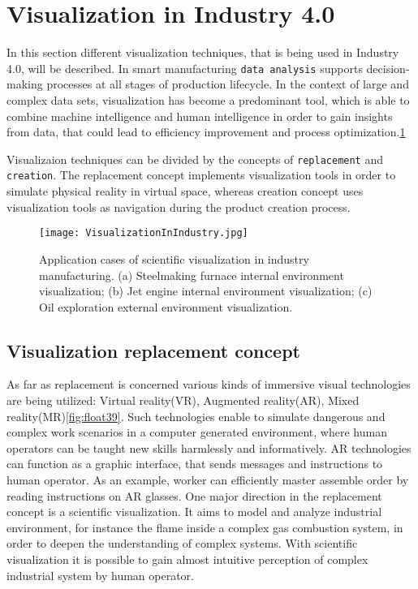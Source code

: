 \documentclass[thesis=B,english]{FITthesis}[2019/12/23]
\begin{document}
\section{Visualization in Industry 4.0}

In this section different visualization techniques, that is being used in Industry 4.0, will be described. In smart manufacturing \verb|data analysis| supports decision-making processes at all stages of production lifecycle. In the context of large and complex data sets, visualization has become a predominant tool, which is able to combine machine intelligence and human intelligence in order to gain insights from data, that could lead to efficiency improvement and process optimization.\ref{fig:float40}

Visualizaion techniques can be divided by the concepts of \verb|replacement| and \verb|creation|. The replacement concept implements visualization tools in order to simulate physical reality in virtual space, whereas creation concept uses visualization tools as navigation during the product creation process. 

\begin{figure}
	\texttt{[image: VisualizationInIndustry.jpg]}
	\caption[Application cases of scientific visualization in industry manufacturing. (a) Steelmaking furnace internal environment visualization; (b) Jet engine internal environment visualization; (c) Oil exploration external environment visualization.]{Application cases of scientific visualization in industry manufacturing. (a) Steelmaking furnace internal environment visualization; (b) Jet engine internal environment visualization; (c) Oil exploration external environment visualization.}\label{fig:float40}
\end{figure} 

\subsection{Visualization replacement concept}

As far as replacement is concerned various kinds of immersive visual technologies are being utilized: Virtual reality(VR), Augmented reality(AR), Mixed reality(MR)\ref{fig:float39}. Such technologies enable to simulate dangerous and complex work scenarios in a computer generated environment, where human operators can be taught new skills harmlessly and informatively. AR technologies can function as a graphic interface, that sends messages and instructions to human operator. As an example, worker can efficiently master assemble order by reading instructions on AR glasses. One major direction in the replacement concept is a scientific visualization. It aims to model and analyze industrial environment, for instance the flame inside a complex gas combustion system, in order to deepen the understanding of complex systems. With scientific visualization it is possible to gain almost intuitive perception of complex industrial system by human operator.
\end{document}

